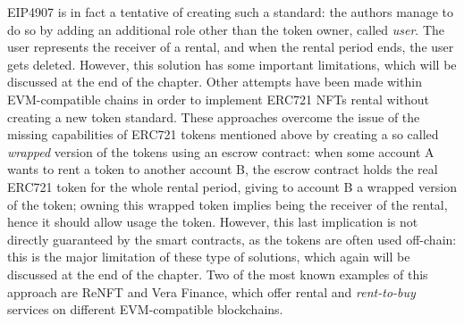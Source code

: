 \documentclass[english, LaM, oneside]{sapthesis}%
\begin{document}
EIP4907 is in fact a tentative of creating such a standard: the authors manage to do so by adding an additional role other than the token owner, called \textit{user}. The user represents the receiver of a rental, and when the rental period ends, the user gets deleted. However, this solution has some important limitations, which will be discussed at the end of the chapter.\newline
Other attempts have been made within EVM-compatible chains in order to implement ERC721 NFTs rental without creating a new token standard. These approaches overcome the issue of the missing capabilities of ERC721 tokens mentioned above by creating a so called \textit{wrapped} version of the tokens using an escrow contract: when some account A wants to rent a token to another account B, the escrow contract holds the real ERC721 token for the whole rental period, giving to account B a wrapped version of the token; owning this wrapped token implies being the receiver of the rental, hence it should allow usage the token. However, this last implication is not directly guaranteed by the smart contracts, as the tokens are often used off-chain: this is the major limitation of these type of solutions, which again will be discussed at the end of the chapter.
Two of the most known examples of this approach are ReNFT\cite{ref:renft} and Vera Finance\cite{ref:vera}, which offer rental and \textit{rent-to-buy} services on different EVM-compatible blockchains.
\end{document}
